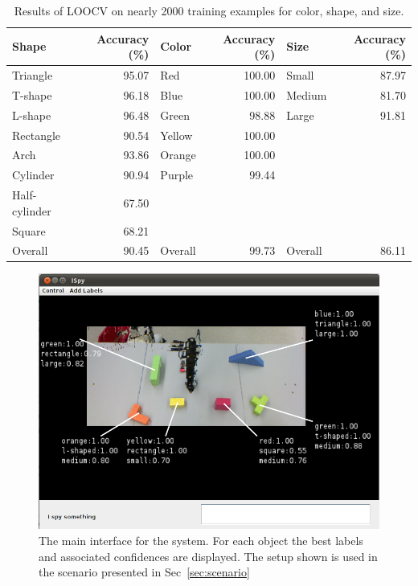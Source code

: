 \documentclass[11pt]{article}
\begin{document}
\begin{table}
    \centering
    \begin{tabular}{||l|r||l|r||l|r||}
        \hline
        Shape         & Accuracy (\%) & Color   & Accuracy (\%) & Size &Accuracy (\%) \\ \hline \hline
        Triangle      & 95.07                & Red     & 100.00               & Small   & 87.97               \\ \hline
        T-shape       & 96.18                & Blue    & 100.00               & Medium  &   81.70             \\ \hline
        L-shape       & 96.48                & Green   & 98.88                & Large   & 91.81               \\ \hline
        Rectangle     & 90.54                & Yellow  & 100.00               & ~  &   ~             \\ \hline
        Arch          & 93.86                & Orange  & 100.00               & ~       & ~                   \\ \hline
        Cylinder      & 90.94                & Purple  & 99.44                & ~       & ~                   \\ \hline
        Half-cylinder & 67.50                & ~        & ~                     & ~       & ~                   \\ \hline
        Square        & 68.21                & ~       & ~                      & ~       & ~                   \\ \hline
        Overall       & 90.45                & Overall       & 99.73         & Overall      & 86.11                   \\
        \hline
    \end{tabular}
    \caption{Results of LOOCV on nearly 2000 training examples for color, shape, and size.}
	\label{tbl:testresults}
\end{table}

\begin{figure}[h!]
\centering
    \includegraphics[width=.75\textwidth]{figures/screenshot.png}
    \caption{The main interface for the system. For each object the best labels and associated confidences are displayed. The setup shown is used in the scenario presented in Sec~\ref{sec:scenario}}
    \label{fig:screenshot}
\end{figure}
\end{document}
